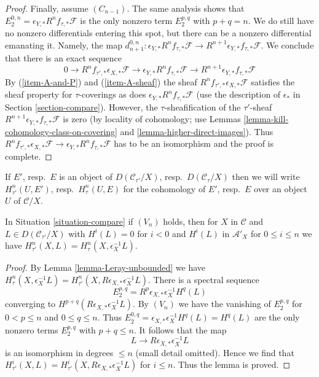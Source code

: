 \begin{proof}
\medskip\noindent
Finally, assume $(C_{n - 1})$. The same analysis shows that
$E_2^{0, n} = \epsilon_{Y, *}R^nf_{\tau, *}\mathcal{F}$
is the only nonzero term $E_2^{p, q}$ with $p + q = n$.
We do still have no nonzero differentials entering
this spot, but there can be a nonzero differential
emanating it. Namely, the map
$d_{n + 1}^{0, n} : \epsilon_{Y, *}R^nf_{\tau, *}\mathcal{F} \to
R^{n + 1}\epsilon_{Y, *}f_{\tau, *}\mathcal{F}$.
We conclude that there is an exact sequence
$$
0 \to R^nf_{\tau', *}\epsilon_{X, *}\mathcal{F} \to 
\epsilon_{Y, *}R^nf_{\tau, *}\mathcal{F} \to
R^{n + 1}\epsilon_{Y, *}f_{\tau, *}\mathcal{F}
$$
By (\ref{item-A-and-P}) and (\ref{item-A-sheaf}) the sheaf
$R^nf_{\tau', *}\epsilon_{X, *}\mathcal{F}$
satisfies the sheaf property for $\tau$-coverings
as does $\epsilon_{Y, *}R^nf_{\tau, *}\mathcal{F}$
(use the description of $\epsilon_*$ in Section \ref{section-compare}).
However, the $\tau$-sheafification of the $\tau'$-sheaf
$R^{n + 1}\epsilon_{Y, *}f_{\tau, *}\mathcal{F}$
is zero (by locality of cohomology; use
Lemmas \ref{lemma-kill-cohomology-class-on-covering} and
\ref{lemma-higher-direct-images}).
Thus $R^nf_{\tau', *}\epsilon_{X, *}\mathcal{F} \to 
\epsilon_{Y, *}R^nf_{\tau, *}\mathcal{F}$
has to be an isomorphism and the proof is complete.
\end{proof}

\noindent
If $E'$, resp.\ $E$ is an object of
$D(\mathcal{C}_{\tau'}/X)$, resp.\ $D(\mathcal{C}_\tau/X)$
then we will write
$H^n_{\tau'}(U, E')$, resp.\ $H^n_\tau(U, E)$
for the cohomology of $E'$, resp.\ $E$
over an object $U$ of $\mathcal{C}/X$.

\begin{lemma}
\label{lemma-V-implies-cohomology-general}
In Situation \ref{situation-compare} if $(V_n)$ holds, then
for $X$ in $\mathcal{C}$ and $L \in D(\mathcal{C}_{\tau'}/X)$
with $H^i(L) = 0$ for $i < 0$ and $H^i(L)$ in $\mathcal{A}'_X$
for $0 \leq i \leq n$ we have
$H^n_{\tau'}(X, L) = H^n_\tau(X, \epsilon_X^{-1}L)$.
\end{lemma}

\begin{proof}
By Lemma \ref{lemma-Leray-unbounded} we have
$H^n_\tau(X, \epsilon_X^{-1}L) =
H^n_{\tau'}(X, R\epsilon_{X, *}\epsilon_X^{-1}L)$.
There is a spectral sequence
$$
E_2^{p, q} = R^p\epsilon_{X, *}\epsilon_X^{-1}H^q(L)
$$
converging to $H^{p + q}(R\epsilon_{X, *}\epsilon_X^{-1}L)$.
By $(V_n)$ we have the vanishing of $E_2^{p, q}$ for
$0 < p \leq n$ and $0 \leq q \leq n$. Thus
$E_2^{0, q} = \epsilon_{X, *}\epsilon_X^{-1}H^q(L) = H^q(L)$
are the only nonzero terms $E_2^{p, q}$ with $p + q \leq n$.
It follows that the map
$$
L \longrightarrow R\epsilon_{X, *}\epsilon_X^{-1}L
$$
is an isomorphism in degrees $\leq n$ (small detail omitted).
Hence we find that
$H^i_{\tau'}(X, L) = H^i_{\tau'}(X, R\epsilon_{X, *}\epsilon_X^{-1}L)$
for $i \leq n$. Thus the lemma is proved.
\end{proof}

